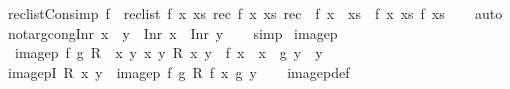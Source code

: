 \begin{isabellebody}
{\isafoldproof}%
%
\isadelimproof
\isanewline
%
\endisadelimproof
\isanewline
{}\isamarkupfalse%
\ rec{\isacharunderscore}{\kern0pt}list{\isacharunderscore}{\kern0pt}Cons{\isacharunderscore}{\kern0pt}imp{\isacharcolon}{\kern0pt}\ {\isachardoublequoteopen}f\ {\isacharequal}{\kern0pt}\ rec{\isacharunderscore}{\kern0pt}list\ f{}\ {\isacharparenleft}{\kern0pt}{\isasymlambda}x\ xs\ rec{\isachardot}{\kern0pt}\ f{}\ x\ xs\ rec{\isacharparenright}{\kern0pt}\ {\isasymLongrightarrow}\ f\ {\isacharparenleft}{\kern0pt}x\ {\isacharhash}{\kern0pt}\ xs{\isacharparenright}{\kern0pt}\ {\isacharequal}{\kern0pt}\ f{}\ x\ xs\ {\isacharparenleft}{\kern0pt}f\ xs{\isacharparenright}{\kern0pt}{\isachardoublequoteclose}\isanewline
%
\isadelimproof
\ \ %
\endisadelimproof
%
\isatagproof
{}\isamarkupfalse%
\ auto%
\endisatagproof
{\isafoldproof}%
%
\isadelimproof
\isanewline
%
\endisadelimproof
\isanewline
{}\isamarkupfalse%
\ not{\isacharunderscore}{\kern0pt}arg{\isacharunderscore}{\kern0pt}cong{\isacharunderscore}{\kern0pt}Inr{\isacharcolon}{\kern0pt}\ {\isachardoublequoteopen}x\ {\isasymnoteq}\ y\ {\isasymLongrightarrow}\ Inr\ x\ {\isasymnoteq}\ Inr\ y{\isachardoublequoteclose}\isanewline
%
\isadelimproof
\ \ %
\endisadelimproof
%
\isatagproof
{}\isamarkupfalse%
\ simp%
\endisatagproof
{\isafoldproof}%
%
\isadelimproof
\isanewline
%
\endisadelimproof
\isanewline
{}\isamarkupfalse%
\ image{}p\ \isanewline
\ \ {\isachardoublequoteopen}image{}p\ f\ g\ R\ {\isacharequal}{\kern0pt}\ {\isacharparenleft}{\kern0pt}{\isasymlambda}x\ y{\isachardot}{\kern0pt}\ {\isasymexists}x{\isacharprime}{\kern0pt}\ y{\isacharprime}{\kern0pt}{\isachardot}{\kern0pt}\ R\ x{\isacharprime}{\kern0pt}\ y{\isacharprime}{\kern0pt}\ {\isasymand}\ f\ x{\isacharprime}{\kern0pt}\ {\isacharequal}{\kern0pt}\ x\ {\isasymand}\ g\ y{\isacharprime}{\kern0pt}\ {\isacharequal}{\kern0pt}\ y{\isacharparenright}{\kern0pt}{\isachardoublequoteclose}\isanewline
\isanewline
{}\isamarkupfalse%
\ image{}pI{\isacharcolon}{\kern0pt}\ {\isachardoublequoteopen}R\ x\ y\ {\isasymLongrightarrow}\ image{}p\ f\ g\ R\ {\isacharparenleft}{\kern0pt}f\ x{\isacharparenright}{\kern0pt}\ {\isacharparenleft}{\kern0pt}g\ y{\isacharparenright}{\kern0pt}{\isachardoublequoteclose}\isanewline
%
\isadelimproof
\ \ %
\endisadelimproof
%
\isatagproof
{}\isamarkupfalse%
\ image{}p{\isacharunderscore}{\kern0pt}def\ \isamarkupfalse%

\end{isabellebody}
